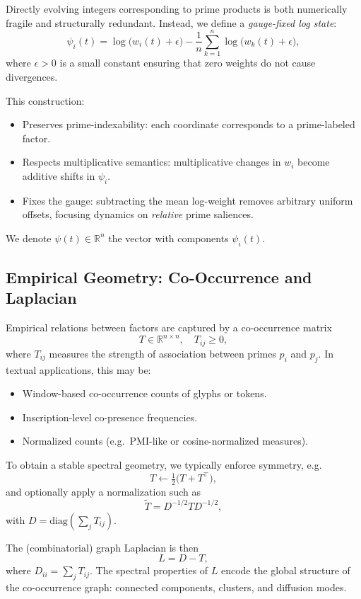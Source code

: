 \documentclass[11pt]{article}
\begin{document}
Directly evolving integers corresponding to prime products is both
numerically fragile and structurally redundant. Instead, we define
a \emph{gauge-fixed log state}:
\[
\psi_i(t)
  = \log\bigl(w_i(t) + \epsilon\bigr)
    - \frac{1}{n}\sum_{k=1}^n \log\bigl(w_k(t) + \epsilon\bigr),
\]
where \(\epsilon>0\) is a small constant ensuring that zero weights
do not cause divergences.

This construction:
\begin{itemize}[nosep]
  \item Preserves prime-indexability: each coordinate corresponds to
        a prime-labeled factor.
  \item Respects multiplicative semantics: multiplicative changes in
        \(w_i\) become additive shifts in \(\psi_i\).
  \item Fixes the gauge: subtracting the mean log-weight removes
        arbitrary uniform offsets, focusing dynamics on \emph{relative}
        prime saliences.
\end{itemize}

We denote \(\psi(t)\in\mathbb{R}^n\) the vector with components
\(\psi_i(t)\).

\subsection{Empirical Geometry: Co-Occurrence and Laplacian}

Empirical relations between factors are captured by a co-occurrence
matrix
\[
T \in \mathbb{R}^{n\times n},\quad T_{ij}\ge 0,
\]
where \(T_{ij}\) measures the strength of association between primes
\(p_i\) and \(p_j\). In textual applications, this may be:
\begin{itemize}[nosep]
  \item Window-based co-occurrence counts of glyphs or tokens.
  \item Inscription-level co-presence frequencies.
  \item Normalized counts (e.g.\ PMI-like or cosine-normalized measures).
\end{itemize}

To obtain a stable spectral geometry, we typically enforce symmetry,
e.g.
\[
T \leftarrow \tfrac{1}{2}\bigl(T + T^\top\bigr),
\]
and optionally apply a normalization such as
\[
\tilde{T} = D^{-1/2} T D^{-1/2},
\]
with \(D = \mathrm{diag}(\sum_j T_{ij})\).

The (combinatorial) graph Laplacian is then
\[
L = D - T,
\]
where \(D_{ii} = \sum_{j} T_{ij}\). The spectral properties of \(L\)
encode the global structure of the co-occurrence graph: connected
components, clusters, and diffusion modes.
\end{document}
